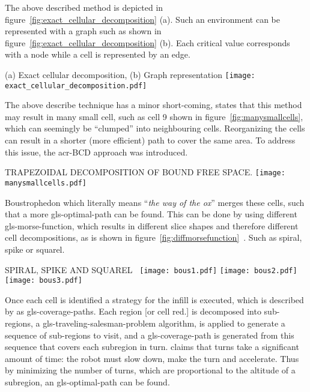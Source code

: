 The above described method is depicted in figure~\ref{fig:exact_cellular_decomposition} (a). Such an environment can be
represented with a graph such as shown in figure~\ref{fig:exact_cellular_decomposition} (b). Each critical value
corresponds with a node while a cell is represented by an edge.

\begin{RoyalFigure}[!htb, label=fig:exact_cellular_decomposition]{(a) Exact cellular decomposition, (b) Graph representation}
	\texttt{[image: exact\_cellular\_decomposition.pdf]}
\end{RoyalFigure}

The above describe technique has a minor short-coming, \citet{choset_exact_2000} states that this method may result in
many small cell, such as cell 9 shown in figure~\ref{fig:manysmallcells}, which can seemingly be ``clumped'' into
neighbouring cells. Reorganizing the cells can result in a shorter (more efficient) path to cover the same area. To
address this issue, the \gls{acr-BCD} approach was introduced.

\begin{RoyalFigure}[!htb, label=fig:manysmallcells]{TRAPEZOIDAL DECOMPOSITION OF BOUND FREE SPACE\cite{choset_exact_2000}.}
		\texttt{[image: manysmallcells.pdf]}
\end{RoyalFigure}

Boustrophedon which literally means ``\emph{the way of the ox}'' merges these cells, such that a more
\gls{gls-optimal-path} can be found. This can be done by using different \gls{gls-morse-function}, which results in
different slice shapes and therefore different cell decompositions, as is shown in
figure~\ref{fig:diffmorsefunction}~\cite{galceran_survey_2013}\cite{choset_coverage_2000}\cite{acar_morse_2002}. Such as
spiral, spike or squarel.

\begin{RoyalFigure}[!htb, label=fig:diffmorsefunction]{SPIRAL, SPIKE AND SQUAREL~\cite{acar_morse_2002}}
		\texttt{[image: bous1.pdf]}
		\texttt{[image: bous2.pdf]}
		\texttt{[image: bous3.pdf]}
\end{RoyalFigure}

Once each cell is identified a strategy for the infill is executed, which is described by \citet{huang_optimal_2001} as
\gls{gls-coverage-path}s. Each region [or cell red.] is decomposed into sub-regions, a
\gls{gls-traveling-salesman-problem} algorithm, is applied to generate a sequence of sub-regions to visit, and a
\gls{gls-coverage-path} is generated from this sequence that covers each subregion in turn. \citet{huang_optimal_2001}
claims that turns take a significant amount of time: the robot must slow down, make the turn and accelerate. Thus by
minimizing the number of turns, which are proportional to the altitude of a subregion, an \gls{gls-optimal-path} can be
found.

